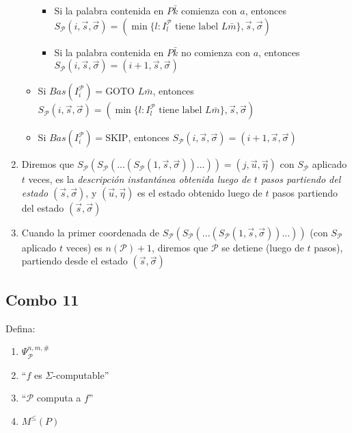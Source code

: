 \documentclass[
]{article}
\providecommand{\tightlist}{%
  \setlength{\itemsep}{0pt}\setlength{\parskip}{0pt}}
\begin{document}
\begin{enumerate}
\begin{itemize}
    \begin{itemize}
    \tightlist
    \item
      Si la palabra contenida en \(P\bar{k}\) comienza con \(a\),
      entonces
      \(S_\mathcal{P}(i,\vec{s},\vec{\sigma})=(\min\{l:I_l^\mathcal{P}\text{ tiene label }L\bar{m}\},\vec{s},\vec{\sigma})\)
    \item
      Si la palabra contenida en \(P\bar{k}\) no comienza con \(a\),
      entonces
      \(S_\mathcal{P}(i,\vec{s},\vec{\sigma})=(i+1,\vec{s},\vec{\sigma})\)
    \end{itemize}
  \item
    Si \(Bas(I_i^\mathcal{P})=\text{GOTO }L\bar{m}\), entonces
    \(S_\mathcal{P}(i,\vec{s},\vec{\sigma})=(\min\{l:I_l^\mathcal{P}\text{ tiene label }L\bar{m}\},\vec{s},\vec{\sigma})\)
  \item
    Si \(Bas(I_i^\mathcal{P})=\text{SKIP}\), entonces
    \(S_\mathcal{P}(i,\vec{s},\vec{\sigma})=(i+1,\vec{s},\vec{\sigma})\)
  \end{itemize}
\item
  Diremos que
  \(S_\mathcal{P}(S_\mathcal{P}(...(S_\mathcal{P}(1,\vec{s},\vec{\sigma}))...))=(j,\vec{u},\vec{\eta})\)
  con \(S_\mathcal{P}\) aplicado \(t\) veces, es la \emph{descripción
  instantánea obtenida luego de \(t\) pasos partiendo del estado
  \((\vec{s},\vec{\sigma})\)}, y \((\vec{u},\vec{\eta})\) es el estado
  obtenido luego de \(t\) pasos partiendo del estado
  \((\vec{s},\vec{\sigma})\)
\item
  Cuando la primer coordenada de
  \(S_\mathcal{P}(S_\mathcal{P}(...(S_\mathcal{P}(1,\vec{s},\vec{\sigma}))...))\)
  (con \(S_\mathcal{P}\) aplicado \(t\) veces) es \(n(\mathcal{P})+1\),
  diremos que \(\mathcal{P}\) se detiene (luego de \(t\) pasos),
  partiendo desde el estado \((\vec{s},\vec{\sigma})\)
\end{enumerate}

\subsection{Combo 11}\label{combo-11}

Defina:

\begin{enumerate}
\def\labelenumi{\arabic{enumi}.}
\tightlist
\item
  \(\Psi_\mathcal{P}^{n,m,\#}\)
\item
  ``\(f\) es \(\Sigma\)-computable''
\item
  ``\(\mathcal{P}\) computa a \(f\)''
\item
  \(M^\leq(P)\)
\end{enumerate}
\end{document}
